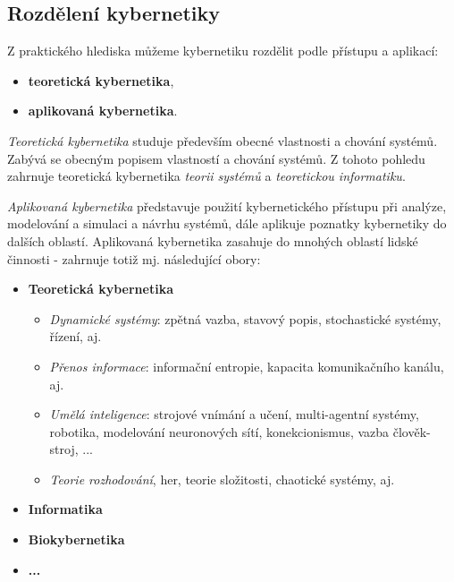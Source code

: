     \subsection{Rozdělení kybernetiky}
      Z praktického hlediska můžeme kybernetiku rozdělit podle přístupu a aplikací:
      \begin{itemize}\addtolength{\itemsep}{-0.5\baselineskip}
        \item \textbf{teoretická kybernetika},
        \item \textbf{aplikovaná kybernetika}.
      \end{itemize}

      \emph{Teoretická kybernetika} studuje především obecné vlastnosti a chování systémů. Zabývá 
      se obecným popisem vlastností a chování systémů. Z tohoto pohledu zahrnuje teoretická 
      kybernetika \emph{teorii systémů} a \emph{teoretickou informatiku}.
      
      \emph{Aplikovaná kybernetika} představuje použití kybernetického přístupu při analýze, 
      modelování a simulaci a návrhu systémů, dále aplikuje poznatky kybernetiky do dalších 
      oblastí. Aplikovaná kybernetika zasahuje do mnohých oblastí lidské činnosti - zahrnuje totiž 
      mj. následující obory:
      
      \begin{itemize}\addtolength{\itemsep}{-0.1\baselineskip}
        \item \textbf{Teoretická kybernetika}
              \begin{itemize}\addtolength{\itemsep}{-0.1\baselineskip}
                \item \emph{Dynamické systémy}: zpětná vazba, stavový popis, stochastické systémy,
                      řízení, aj.
                \item \emph{Přenos informace}: informační entropie, kapacita komunikačního kanálu, 
                      aj. 
                \item \emph{Umělá inteligence}: strojové vnímání a učení, multi-agentní systémy, 
                      robotika, modelování neuronových sítí, konekcionismus, vazba člověk-stroj, ...
                \item \emph{Teorie rozhodování}, her, teorie složitosti, chaotické systémy, aj.
              \end{itemize}
        \item \textbf{Informatika}
        \item \textbf{Biokybernetika}
        \item \textbf{...}
      \end{itemize}
      
